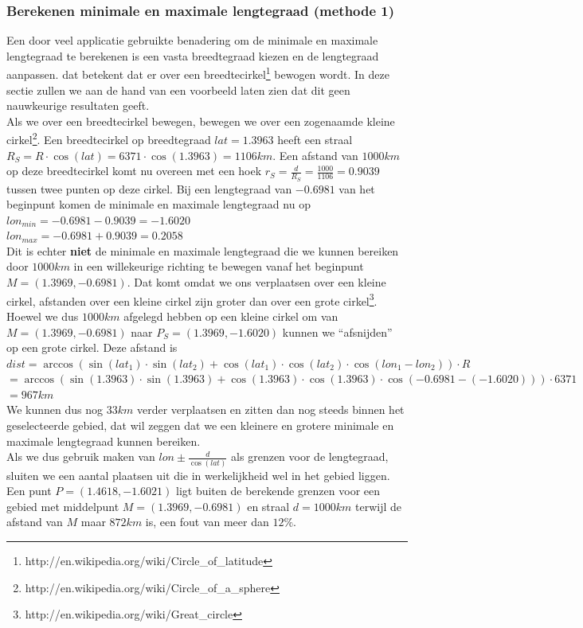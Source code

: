 \documentclass[twoside,openright]{uva-bachelor-thesis}
\begin{document}
		\subsubsection{Berekenen minimale en maximale lengtegraad (methode 1)}
		Een door veel applicatie gebruikte benadering om de minimale en maximale lengtegraad te berekenen is een vasta breedtegraad kiezen en de lengtegraad aanpassen. dat betekent dat er over een breedtecirkel\footnote{http://en.wikipedia.org/wiki/Circle\_of\_latitude} bewogen wordt. In deze sectie zullen we aan de hand van een voorbeeld laten zien dat dit geen nauwkeurige resultaten geeft.
		\\[0.5cm]
		Als we over een breedtecirkel bewegen, bewegen we over een zogenaamde kleine cirkel\footnote{http://en.wikipedia.org/wiki/Circle\_of\_a\_sphere}. Een breedtecirkel op breedtegraad $lat = 1.3963$ heeft een straal $R_{S} = R \cdot \cos(lat) = 6371 \cdot \cos(1.3963) = 1106km$. Een afstand van $1000km$ op deze breedtecirkel komt nu overeen met een hoek $r_{S} = \frac{d}{R_{S}} = \frac{1000}{1106} = 0.9039$ tussen twee punten op deze cirkel. Bij een lengtegraad van $-0.6981$ van het beginpunt komen de minimale en maximale lengtegraad nu op
		\\[0.5cm]
		$lon_{min} = -0.6981 - 0.9039 = -1.6020$\\
		$lon_{max} = -0.6981 + 0.9039 = 0.2058$\\[0.5cm]
		Dit is echter \textbf{niet} de minimale en maximale lengtegraad die we kunnen bereiken door $1000km$ in een willekeurige richting te bewegen vanaf het beginpunt $M = (1.3969, -0.6981)$. Dat komt omdat we ons verplaatsen over een kleine cirkel, afstanden over een kleine cirkel zijn groter dan over een grote cirkel\footnote{http://en.wikipedia.org/wiki/Great\_circle}. Hoewel we dus $1000km$ afgelegd hebben op een kleine cirkel om van $M = (1.3969, -0.6981)$ naar $P_{S} = (1.3969, -1.6020)$ kunnen we ``afsnijden'' op een grote cirkel. Deze afstand is\\[0.5cm]		
		$dist = \arccos(\sin(lat_1) \cdot \sin(lat_2) + \cos(lat_1) \cdot \cos(lat_2) \cdot \cos(lon_1 - lon_2)) \cdot R$\\
		$= \arccos(\sin(1.3963) \cdot \sin(1.3963) + \cos(1.3963) \cdot \cos(1.3963) \cdot \cos(-0.6981 - (-1.6020))) \cdot 6371$\\
		$= 967km$\\[0.5cm]
		We kunnen dus nog $33km$ verder verplaatsen en zitten dan nog steeds binnen het geselecteerde gebied, dat wil zeggen dat we een kleinere en grotere minimale en maximale lengtegraad kunnen bereiken.\\[0.5cm]
		Als we dus gebruik maken van $lon \pm \frac{d}{\cos(lat)}$ als grenzen voor de lengtegraad, sluiten we een aantal plaatsen uit die in werkelijkheid wel in het gebied liggen. Een punt $P = (1.4618, -1.6021)$ ligt buiten de berekende grenzen voor een gebied met middelpunt $M = (1.3969, -0.6981)$ en straal $d = 1000km$  terwijl de afstand van $M$ maar $872km$ is, een fout van meer dan $12\%$.
\end{document}
